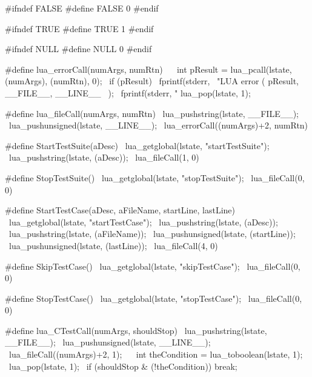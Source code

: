 #ifndef FALSE
#define FALSE 0
#endif

#ifndef TRUE
#define TRUE 1
#endif

#ifndef NULL
#define NULL 0
#endif

#define lua_errorCall(numArgs, numRtn)                     \
{                                                          \
  int pResult = lua_pcall(lstate, (numArgs), (numRtn), 0); \
  if (pResult) {                                           \
    fprintf(stderr,                                        \
      "LUA error (%
      pResult, __FILE__, __LINE__                          \
    );                                                     \
    fprintf(stderr, "%
    lua_pop(lstate, 1);                                    \
  }                                                        \
}

#define lua_fileCall(numArgs, numRtn)            \
  lua_pushstring(lstate, __FILE__);              \
  lua_pushunsigned(lstate, __LINE__);            \
  lua_errorCall((numArgs)+2, numRtn)

#define StartTestSuite(aDesc)              \
  lua_getglobal(lstate, "startTestSuite"); \
  lua_pushstring(lstate, (aDesc));         \
  lua_fileCall(1, 0)

#define StopTestSuite()                   \
  lua_getglobal(lstate, "stopTestSuite"); \
  lua_fileCall(0, 0)

#define StartTestCase(aDesc, aFileName, startLine, lastLine) \
  lua_getglobal(lstate, "startTestCase");                    \
  lua_pushstring(lstate, (aDesc));                           \
  lua_pushstring(lstate, (aFileName));                       \
  lua_pushunsigned(lstate, (startLine));                     \
  lua_pushunsigned(lstate, (lastLine));                      \
  lua_fileCall(4, 0)

#define SkipTestCase()                   \
  lua_getglobal(lstate, "skipTestCase"); \
  lua_fileCall(0, 0)

#define StopTestCase()                   \
  lua_getglobal(lstate, "stopTestCase"); \
  lua_fileCall(0, 0)

#define lua_CTestCall(numArgs, shouldStop)       \
  lua_pushstring(lstate, __FILE__);              \
  lua_pushunsigned(lstate, __LINE__);            \
  lua_fileCall((numArgs)+2, 1);                  \
  {                                              \
    int theCondition = lua_toboolean(lstate, 1); \
    lua_pop(lstate, 1);                          \
    if (shouldStop & (!theCondition)) break;     \
  }
\stopCHeader

